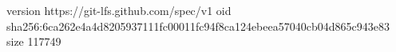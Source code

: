 version https://git-lfs.github.com/spec/v1
oid sha256:6ca262e4a4d8205937111fc00011fc94f8ca124ebeea57040cb04d865c943e83
size 117749
